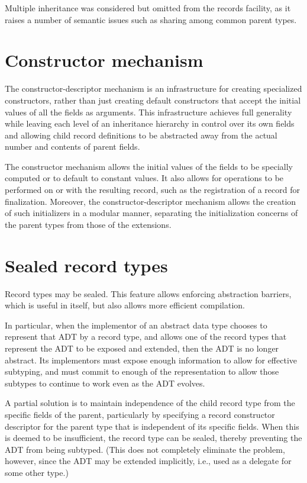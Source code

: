 \documentclass[twoside,twocolumn]{algol60}
\begin{document}
Multiple inheritance was considered but omitted from the records
facility, as it raises a number of semantic issues such as sharing
among common parent types.

\section{Constructor mechanism}

The constructor-descriptor mechanism is an infra\-struc\-ture for
creating specialized constructors, rather than just creating default
constructors that accept the initial values of all the fields as
arguments. This infrastructure achieves full generality while leaving
each level of an inheritance hierarchy in control over its own fields
and allowing child record definitions to be abstracted away from the
actual number and contents of parent fields.

The constructor mechanism allows the initial values of the fields to be specially
computed or to default to constant values. It also allows for
operations to be performed on or with the resulting record, such as
the registration of a record for finalization. Moreover, the
constructor-descriptor mechanism allows the creation of such
initializers in a modular manner, separating the initialization
concerns of the parent types from those of the extensions.

\section{Sealed record types}

Record types may be sealed.  This feature allows enforcing abstraction
barriers, which is useful in itself, but also allows more efficient
compilation.

In particular, when the implementor of an abstract data type chooses
to represent that ADT by a record type, and allows one of the record types
that represent the ADT to be exposed and extended, then the ADT is
no longer abstract.  Its implementors must expose enough information
to allow for effective subtyping, and must commit to enough of the
representation to allow those subtypes to continue to work even as
the ADT evolves.

A partial solution is to maintain independence of the child record type
from the specific fields of the parent, particularly by specifying a
record constructor descriptor for the parent type that is independent of
its specific fields.
When this is deemed to be insufficient, the record type can be sealed,
thereby preventing the ADT from being subtyped.
(This does not completely eliminate the problem, however, since the ADT
may be extended implicitly, i.e., used as a delegate for some other type.)
\end{document}
